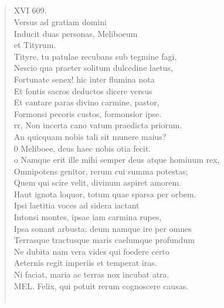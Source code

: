 \documentclass[11pt, a4paper]{report}
\begin{document}
            \subsection*{}
      \begin{verse}
      XVI 609. \\ Versus ad gratiam domini \\ Inducit duas personas, Meliboeum \\ et Tityrum. \\ Tityre, tu patulae recubans sub tegmine fagi, \\ Nescio qua praeter solitum dulcedine laetus, \\ Fortunate senex! hic inter flumina nota \\ Et fontis sacros deductos dicere versus \\ Et cantare paras divino carmine, pastor, \\ Formonsi pecoris custos, formonsior ipse. \\ rr, Non incerta cano vatum praedicta priorum. \\ An quicquam nobis tali sit munere maius? \\ 0 Meliboee, deus haec nobis otia fecit. \\ o Namque erit ille mihi semper deus atque homiuum rex, \\ Omnipotens genitor, rerum cui summa potestas; \\ Quem qui scire velit, divinum aspiret amorem. \\ Haut ignota loquor, totum quae sparsa per orbem. \\ Ipsi laetitia voces ad sidera iactant \\ Intonsi montes, ipsae iam carmina rupes, \\ Ipsa sonant arbusta: deum namque ire per omnes \\ Terrasque tractusque maris caelumque profundum \\ Ne dubita nam vera vides qui foedere certo \\ Aeternis regit imperiis et temperat iras. \\ Ni faciat, maria ac terras nox incubat atra. \\ MEL. Felix, qui potuit rerum cognoscere causas. \\ 
        ﻿\pagebreak 

\end{verse}
\end{document}
